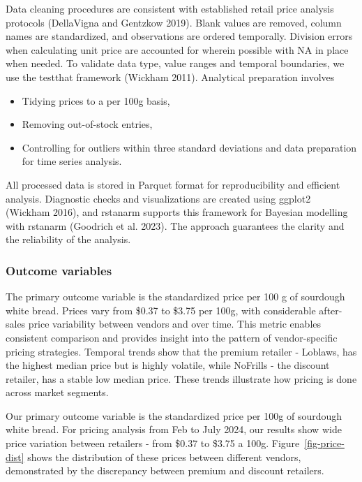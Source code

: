 \documentclass[
  letterpaper,
  DIV=11,
  numbers=noendperiod]{scrartcl}
\begin{document}
Data cleaning procedures are consistent with established retail price
analysis protocols (DellaVigna and Gentzkow 2019). Blank values are
removed, column names are standardized, and observations are ordered
temporally. Division errors when calculating unit price are accounted
for wherein possible with NA in place when needed. To validate data
type, value ranges and temporal boundaries, we use the testthat
framework (Wickham 2011). Analytical preparation involves

\begin{itemize}
\item
  Tidying prices to a per 100g basis,
\item
  Removing out-of-stock entries,
\item
  Controlling for outliers within three standard deviations and data
  preparation for time series analysis.
\end{itemize}

All processed data is stored in Parquet format for reproducibility and
efficient analysis. Diagnostic checks and visualizations are created
using ggplot2 (Wickham 2016), and rstanarm supports this framework for
Bayesian modelling with rstanarm (Goodrich et al. 2023). The approach
guarantees the clarity and the reliability of the analysis.

\subsubsection{Outcome variables}\label{outcome-variables}

The primary outcome variable is the standardized price per 100 g of
sourdough white bread. Prices vary from \$0.37 to \$3.75 per 100g, with
considerable after-sales price variability between vendors and over
time. This metric enables consistent comparison and provides insight
into the pattern of vendor-specific pricing strategies. Temporal trends
show that the premium retailer - Loblaws, has the highest median price
but is highly volatile, while NoFrills - the discount retailer, has a
stable low median price. These trends illustrate how pricing is done
across market segments.

Our primary outcome variable is the standardized price per 100g of
sourdough white bread. For pricing analysis from Feb to July 2024, our
results show wide price variation between retailers - from \$0.37 to
\$3.75 a 100g. Figure~\ref{fig-price-dist} shows the distribution of
these prices between different vendors, demonstrated by the discrepancy
between premium and discount retailers.
\end{document}
